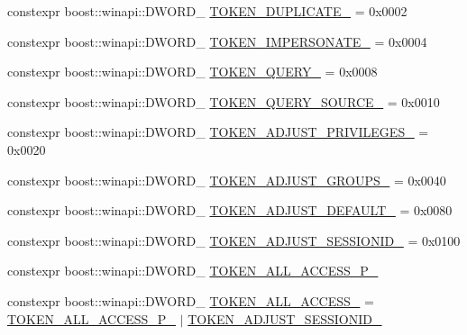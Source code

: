 \begin{DoxyCompactItemize}
\item 
constexpr boost\+::winapi\+::\+D\+W\+O\+R\+D\+\_\+ \mbox{\hyperlink{namespaceboost_1_1winapi_a24320c5b14eb3b2076bb80b310d69e28}{T\+O\+K\+E\+N\+\_\+\+D\+U\+P\+L\+I\+C\+A\+T\+E\+\_\+}} = 0x0002
\item 
constexpr boost\+::winapi\+::\+D\+W\+O\+R\+D\+\_\+ \mbox{\hyperlink{namespaceboost_1_1winapi_acf614cf0385c34f998b17e1a4aac2f5a}{T\+O\+K\+E\+N\+\_\+\+I\+M\+P\+E\+R\+S\+O\+N\+A\+T\+E\+\_\+}} = 0x0004
\item 
constexpr boost\+::winapi\+::\+D\+W\+O\+R\+D\+\_\+ \mbox{\hyperlink{namespaceboost_1_1winapi_aa8d690e5577abdf2d156cbcda5cf23fb}{T\+O\+K\+E\+N\+\_\+\+Q\+U\+E\+R\+Y\+\_\+}} = 0x0008
\item 
constexpr boost\+::winapi\+::\+D\+W\+O\+R\+D\+\_\+ \mbox{\hyperlink{namespaceboost_1_1winapi_af504352b775da9ed41d3e8d451fb60b2}{T\+O\+K\+E\+N\+\_\+\+Q\+U\+E\+R\+Y\+\_\+\+S\+O\+U\+R\+C\+E\+\_\+}} = 0x0010
\item 
constexpr boost\+::winapi\+::\+D\+W\+O\+R\+D\+\_\+ \mbox{\hyperlink{namespaceboost_1_1winapi_ae421c93ef942bc0c7728ecd495a19208}{T\+O\+K\+E\+N\+\_\+\+A\+D\+J\+U\+S\+T\+\_\+\+P\+R\+I\+V\+I\+L\+E\+G\+E\+S\+\_\+}} = 0x0020
\item 
constexpr boost\+::winapi\+::\+D\+W\+O\+R\+D\+\_\+ \mbox{\hyperlink{namespaceboost_1_1winapi_a5bceb0371395d6c4af2c6fd537a9df1c}{T\+O\+K\+E\+N\+\_\+\+A\+D\+J\+U\+S\+T\+\_\+\+G\+R\+O\+U\+P\+S\+\_\+}} = 0x0040
\item 
constexpr boost\+::winapi\+::\+D\+W\+O\+R\+D\+\_\+ \mbox{\hyperlink{namespaceboost_1_1winapi_a392915600d4ba82203d0ac72f10e8563}{T\+O\+K\+E\+N\+\_\+\+A\+D\+J\+U\+S\+T\+\_\+\+D\+E\+F\+A\+U\+L\+T\+\_\+}} = 0x0080
\item 
constexpr boost\+::winapi\+::\+D\+W\+O\+R\+D\+\_\+ \mbox{\hyperlink{namespaceboost_1_1winapi_a578f20e58ff86d7b1d90d57967d5804d}{T\+O\+K\+E\+N\+\_\+\+A\+D\+J\+U\+S\+T\+\_\+\+S\+E\+S\+S\+I\+O\+N\+I\+D\+\_\+}} = 0x0100
\item 
constexpr boost\+::winapi\+::\+D\+W\+O\+R\+D\+\_\+ \mbox{\hyperlink{namespaceboost_1_1winapi_ad8a9a381342ee6b398fd35fa744c31a1}{T\+O\+K\+E\+N\+\_\+\+A\+L\+L\+\_\+\+A\+C\+C\+E\+S\+S\+\_\+\+P\+\_\+}}
\item 
constexpr boost\+::winapi\+::\+D\+W\+O\+R\+D\+\_\+ \mbox{\hyperlink{namespaceboost_1_1winapi_a22cc3c0934682021bd512ee6fddaaac2}{T\+O\+K\+E\+N\+\_\+\+A\+L\+L\+\_\+\+A\+C\+C\+E\+S\+S\+\_\+}} = \mbox{\hyperlink{namespaceboost_1_1winapi_ad8a9a381342ee6b398fd35fa744c31a1}{T\+O\+K\+E\+N\+\_\+\+A\+L\+L\+\_\+\+A\+C\+C\+E\+S\+S\+\_\+\+P\+\_\+}} $\vert$ \mbox{\hyperlink{namespaceboost_1_1winapi_a578f20e58ff86d7b1d90d57967d5804d}{T\+O\+K\+E\+N\+\_\+\+A\+D\+J\+U\+S\+T\+\_\+\+S\+E\+S\+S\+I\+O\+N\+I\+D\+\_\+}}

\end{DoxyCompactItemize}
